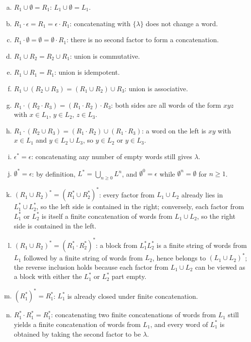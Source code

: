 \begin{enumerate}[{6.}1.]
\begin{enumerate}[(a)]
  \item $R_1\cup\emptyset=R_1$: $L_1\cup\emptyset=L_1$.
  \item $R_1\cdot\epsilon=R_1=\epsilon\cdot R_1$: concatenating with $\{\lambda\}$ does not change a word.
  \item $R_1\cdot\emptyset=\emptyset=\emptyset\cdot R_1$: there is no second factor to form a concatenation.
  \item $R_1\cup R_2=R_2\cup R_1$: union is commutative.
  \item $R_1\cup R_1=R_1$: union is idempotent.
  \item $R_1\cup(R_2\cup R_3)=(R_1\cup R_2)\cup R_3$: union is associative.
  \item $R_1\cdot(R_2\cdot R_3)=(R_1\cdot R_2)\cdot R_3$: both sides are all words of the form $xyz$ with $x\in L_1$, $y\in L_2$, $z\in L_3$.
  \item $R_1\cdot(R_2\cup R_3)=(R_1\cdot R_2)\cup(R_1\cdot R_3)$: a word on the left is $xy$ with $x\in L_1$ and $y\in L_2\cup L_3$, so $y\in L_2$ or $y\in L_3$.
  \item $\epsilon^*=\epsilon$: concatenating any number of empty words still gives $\lambda$.
  \item $\emptyset^*=\epsilon$: by definition, $L^*=\bigcup_{n\ge 0}L^n$, and $\emptyset^0=\epsilon$ while $\emptyset^n=\emptyset$ for $n\ge 1$.
  \item $(R_1\cup R_2)^*=(R_1^*\cup R_2^*)^*$: every factor from $L_1\cup L_2$ already lies in $L_1^*\cup L_2^*$, so the left side is contained in the right; conversely, each factor from $L_1^*$ or $L_2^*$ is itself a finite concatenation of words from $L_1\cup L_2$, so the right side is contained in the left.
  \item $(R_1\cup R_2)^*=(R_1^*\cdot R_2^*)^*$: a block from $L_1^*L_2^*$ is a finite string of words from $L_1$ followed by a finite string of words from $L_2$, hence belongs to $(L_1\cup L_2)^*$; the reverse inclusion holds because each factor from $L_1\cup L_2$ can be viewed as a block with either the $L_1^*$ or $L_2^*$ part empty.
  \item $(R_1^*)^*=R_1^*$: $L_1^*$ is already closed under finite concatenation.
  \item $R_1^*\cdot R_1^*=R_1^*$: concatenating two finite concatenations of words from $L_1$ still yields a finite concatenation of words from $L_1$, and every word of $L_1^*$ is obtained by taking the second factor to be $\lambda$.
\end{enumerate}


\end{enumerate}
